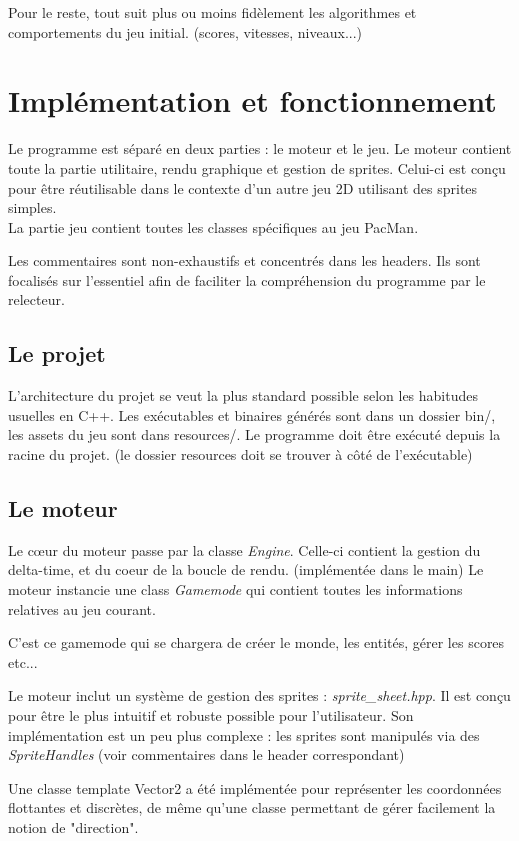 \documentclass [twoside,a4paper,11pt,french] {report}
\begin{document}
    Pour le reste, tout suit plus ou moins fidèlement les algorithmes et comportements du jeu initial.
    (scores, vitesses, niveaux...)

\chapter{Implémentation et fonctionnement}
    Le programme est séparé en deux parties : le moteur et le jeu. Le moteur contient toute la partie utilitaire,
    rendu graphique et gestion de sprites. Celui-ci est conçu pour être
    réutilisable dans le contexte d'un autre jeu 2D utilisant des sprites simples. \\
    La partie jeu contient toutes les classes spécifiques au jeu PacMan.

    Les commentaires sont non-exhaustifs et concentrés dans les headers.
    Ils sont focalisés sur l'essentiel afin de faciliter la compréhension du programme par le relecteur.

\section{Le projet}
    L'architecture du projet se veut la plus standard possible selon les habitudes usuelles en C++.
    Les exécutables et binaires générés sont dans un dossier bin/, les assets du jeu sont dans resources/.
    Le programme doit être exécuté depuis la racine du projet. (le dossier resources doit se trouver à côté
    de l'exécutable)


\section{Le moteur}
    Le cœur du moteur passe par la classe \textit{Engine}. Celle-ci contient la gestion du delta-time, et du coeur de
    la boucle de rendu. (implémentée dans le main)
    Le moteur instancie une class \textit{Gamemode} qui contient toutes les informations relatives au jeu courant.

    C'est ce gamemode qui se chargera de créer le monde, les entités, gérer les scores etc...

    Le moteur inclut un système de gestion des sprites : \textit{sprite\_sheet.hpp}. Il est conçu pour être le plus
    intuitif et robuste possible pour l'utilisateur. Son implémentation est un peu plus complexe : les sprites sont
    manipulés via des \textit{SpriteHandles} (voir commentaires dans le header correspondant)

    Une classe template Vector2 a été implémentée pour représenter les coordonnées flottantes et discrètes, de même
    qu'une classe permettant de gérer facilement la notion de "direction".
\end{document}
